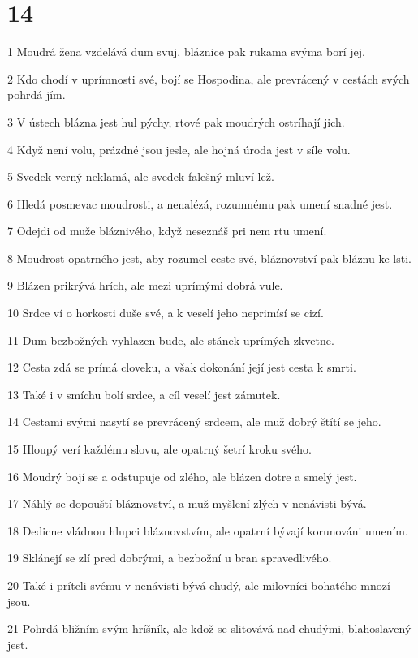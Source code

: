\chapter{14}

\par 1 Moudrá žena vzdelává dum svuj, bláznice pak rukama svýma borí jej.
\par 2 Kdo chodí v uprímnosti své, bojí se Hospodina, ale prevrácený v cestách svých pohrdá jím.
\par 3 V ústech blázna jest hul pýchy, rtové pak moudrých ostríhají jich.
\par 4 Když není volu, prázdné jsou jesle, ale hojná úroda jest v síle volu.
\par 5 Svedek verný neklamá, ale svedek falešný mluví lež.
\par 6 Hledá posmevac moudrosti, a nenalézá, rozumnému pak umení snadné jest.
\par 7 Odejdi od muže bláznivého, když neseznáš pri nem rtu umení.
\par 8 Moudrost opatrného jest, aby rozumel ceste své, bláznovství pak bláznu ke lsti.
\par 9 Blázen prikrývá hrích, ale mezi uprímými dobrá vule.
\par 10 Srdce ví o horkosti duše své, a k veselí jeho neprimísí se cizí.
\par 11 Dum bezbožných vyhlazen bude, ale stánek uprímých zkvetne.
\par 12 Cesta zdá se prímá cloveku, a však dokonání její jest cesta k smrti.
\par 13 Také i v smíchu bolí srdce, a cíl veselí jest zámutek.
\par 14 Cestami svými nasytí se prevrácený srdcem, ale muž dobrý štítí se jeho.
\par 15 Hloupý verí každému slovu, ale opatrný šetrí kroku svého.
\par 16 Moudrý bojí se a odstupuje od zlého, ale blázen dotre a smelý jest.
\par 17 Náhlý se dopouští bláznovství, a muž myšlení zlých v nenávisti bývá.
\par 18 Dedicne vládnou hlupci bláznovstvím, ale opatrní bývají korunováni umením.
\par 19 Sklánejí se zlí pred dobrými, a bezbožní u bran spravedlivého.
\par 20 Také i príteli svému v nenávisti bývá chudý, ale milovníci bohatého mnozí jsou.
\par 21 Pohrdá bližním svým hríšník, ale kdož se slitovává nad chudými, blahoslavený jest.
